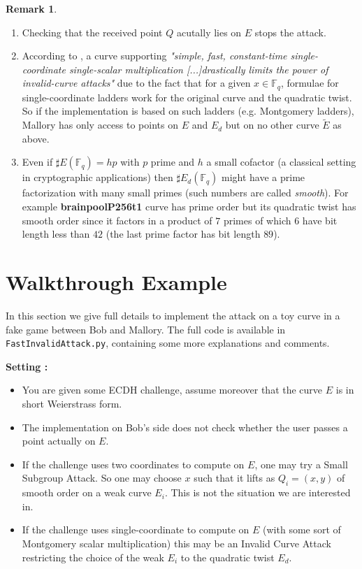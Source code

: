 \documentclass[10pt]{article}
\theoremstyle{definition}
\newtheorem{remark}{Remark}
\newcommand{\F}{\mathbb{F}}
\begin{document}
\begin{remark}
\begin{enumerate}
\item Checking that the received point $Q$ acutally lies on $E$ stops the attack.
\item According to \cite{cryptoeprint:2024/1265}, a curve supporting \textsl{"simple, fast, constant-time single-coordinate single-scalar multiplication [...]drastically limits the power of invalid-curve attacks"} due to the fact that for a given $x \in \F_q$, formulae for single-coordinate ladders work for the original curve and the quadratic twist.
So if the implementation is based on such ladders (e.g. Montgomery ladders), Mallory has only access to points on $E$ and $E_d$ but on no other curve $\tilde{E}$ as above.
\item Even if $\sharp{} E(\F_q) = hp$ with $p$ prime and $h$ a small cofactor (a classical setting in cryptographic applications) then $\sharp{}E_d(\F_q)$ might have a prime factorization with many small primes (such numbers are called \textsl{smooth}).
For example \textbf{brainpoolP256t1} curve has prime order but its quadratic twist has smooth order since it factors in a product of $7$ primes of which $6$ have bit length less than $42$ (the last prime factor has bit length $89$).
\end{enumerate}
\end{remark}

\section{Walkthrough Example}

In this section we give full details to implement the attack on a toy curve in a fake game between Bob and Mallory.
The full code is available in \verb|FastInvalidAttack.py|, containing some more explanations and comments.

\vspace*{.5cm}
\textbf{Setting :} 
\begin{itemize}
\item You are given some ECDH challenge, assume moreover that the curve $E$ is in short Weierstrass form.
\item The implementation on Bob's side does not check whether the user passes a point actually on $E$.
\item If the challenge uses two coordinates to compute on $E$, one may try a Small Subgroup Attack.
So one may choose $x$ such that it lifts as $Q_i=(x,y)$ of smooth order on a weak curve $E_i$.
This is not the situation we are interested in.
\item If the challenge uses single-coordinate to compute on $E$ (with some sort of Montgomery scalar multiplication) this may be an Invalid Curve Attack restricting the choice of the weak $E_i$ to the quadratic twist $E_d$.
\end{itemize}
\end{document}
